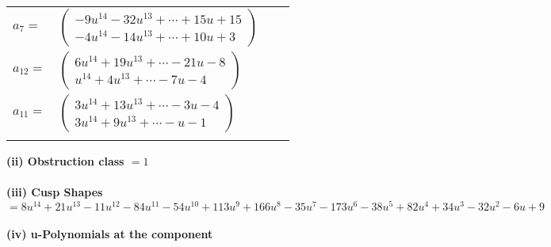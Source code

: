 \documentclass[1p]{elsarticle_modified}
\theoremstyle{definition}
\begin{document}
\begin{tabular}{m{7pt} m{180pt} m{7pt} m{180pt} }
\flushright $a_{7}=$&$\begin{pmatrix}-9 u^{14}-32 u^{13}+\cdots+15 u+15\\-4 u^{14}-14 u^{13}+\cdots+10 u+3\end{pmatrix}$ \\
\flushright $a_{12}=$&$\begin{pmatrix}6 u^{14}+19 u^{13}+\cdots-21 u-8\\u^{14}+4 u^{13}+\cdots-7 u-4\end{pmatrix}$ \\
\flushright $a_{11}=$&$\begin{pmatrix}3 u^{14}+13 u^{13}+\cdots-3 u-4\\3 u^{14}+9 u^{13}+\cdots- u-1\end{pmatrix}$\\&\end{tabular}
\flushleft \textbf{(ii) Obstruction class $= 1$}\\~\\
\flushleft \textbf{(iii) Cusp Shapes $= 8 u^{14}+21 u^{13}-11 u^{12}-84 u^{11}-54 u^{10}+113 u^9+166 u^8-35 u^7-173 u^6-38 u^5+82 u^4+34 u^3-32 u^2-6 u+9$}\\~\\
\newpage\renewcommand{\arraystretch}{1}
\flushleft \textbf{(iv) u-Polynomials at the component}\newline \\
\end{document}
